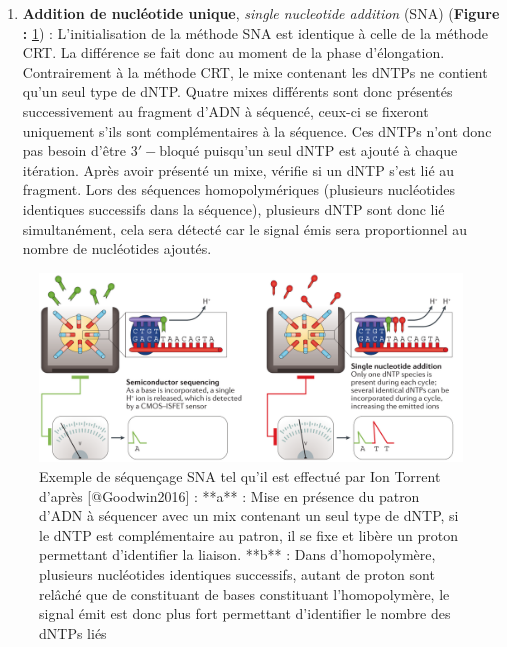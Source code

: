 \documentclass[12pt,twoside]{reedthesis}
\providecommand{\tightlist}{%
  \setlength{\itemsep}{0pt}\setlength{\parskip}{0pt}}
\theoremstyle{definition}
\theoremstyle{definition}
\theoremstyle{remark}
\begin{document}
  \begin{enumerate}
  \def\labelenumi{\alph{enumi}.}
  \setcounter{enumi}{1}
  \tightlist
  \item
    \textbf{Addition de nucléotide unique}, \emph{single nucleotide
    addition} (SNA) (\textbf{Figure : }\ref{fig:snaSeq}) :
    L'initialisation de la méthode SNA est identique à celle de la méthode
    CRT. La différence se fait donc au moment de la phase d'élongation.
    Contrairement à la méthode CRT, le mixe contenant les dNTPs ne
    contient qu'un seul type de dNTP. Quatre mixes différents sont donc
    présentés successivement au fragment d'ADN à séquencé, ceux-ci se
    fixeront uniquement s'ils sont complémentaires à la séquence. Ces
    dNTPs n'ont donc pas besoin d'être \(\mathrm{3'-bloqué}\) puisqu'un
    seul dNTP est ajouté à chaque itération. Après avoir présenté un mixe,
    vérifie si un dNTP s'est lié au fragment. Lors des séquences
    homopolymériques (plusieurs nucléotides identiques successifs dans la
    séquence), plusieurs dNTP sont donc lié simultanément, cela sera
    détecté car le signal émis sera proportionnel au nombre de nucléotides
    ajoutés.
  \end{enumerate}
  
  \begin{figure}
  
  {\centering \includegraphics[scale=.26]{figure/SNA_seq_ionTorrent} 
  
  }
  
  \caption[Exemple de séquençage SNA tel qu'il est effectué par Ion Torrent]{Exemple de séquençage SNA tel qu'il est effectué par Ion Torrent d'après [@Goodwin2016] : **a** : Mise en présence du patron d'ADN à séquencer avec un mix contenant un seul type de dNTP, si le dNTP est complémentaire au patron, il se fixe et libère un proton permettant d'identifier la liaison. **b** : Dans d'homopolymère, plusieurs nucléotides identiques successifs, autant de proton sont relâché que de constituant de bases constituant l'homopolymère, le signal émit est donc plus fort permettant d'identifier le nombre des dNTPs liés}\label{fig:snaSeq}
  \end{figure}
  
\end{document}
